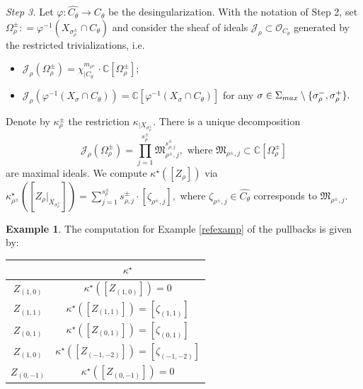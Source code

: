 \documentclass[11pt, reqno]{amsart}
\theoremstyle{plain}
\theoremstyle{definition}
\newtheorem{example}[theorem]{Example}
\theoremstyle{remark}
\begin{document}
\emph{Step 3.}
Let $\varphi: \widehat{C_{\theta}}\rightarrow C_{\theta}$ be the desingularization. With the notation of Step 2, set $\Omega^{\pm}_{\rho} : = 
\varphi^{-1}(X_{\sigma_{\rho}^{\pm}}\cap C_{\theta})$ and consider the sheaf of ideals $\mathscr{J}_{\rho}\subset \mathcal{O}_{C_{\theta}}$ generated by the restricted trivializations, i.e.
\begin{itemize}
\item[(i)] $\mathscr{J}_{\rho}(\Omega_{\rho}^{\pm}) =  \chi^{m_{\rho^{\pm}}}_{|C_{\theta}}\cdot \mathbb{C}[\Omega^{\pm}_{\rho}]$;
\item[(ii)] $\mathscr{J}_{\rho}(\varphi^{-1}(X_{\sigma}\cap C_{\theta})) =  \mathbb{C}[\varphi^{-1}(X_{\sigma}\cap C_{\theta})]$ for any 
$\sigma\in \Sigma_{\rm max}\setminus\{\sigma_{\rho}^{-}, \sigma_{\rho}^{+}\}.$
\end{itemize}
Denote by $\kappa_{\rho}^{\pm}$ the restriction $\kappa_{|X_{\sigma_{\rho}^{\pm}}}$. There is a unique decomposition 
$$\mathscr{J}_{\rho}(\Omega_{\rho}^{\pm}) =  \prod_{j = 1}^{s_{\rho}^{\pm}}\mathfrak{M}_{\rho^{\pm}, j}^{s_{\rho, j}^{\pm}},\text{ where }\mathfrak{M}_{\rho^{\pm}, j}\subset \mathbb{C}[\Omega_{\rho}^{\pm}]$$
are maximal ideals. 
We compute $\kappa^{\star}([Z_{\rho}])$ via 
$\kappa^{\star}_{\rho^{\pm}}([Z_{\rho}|_{X_{\sigma_{\rho}^{\pm}}}]) =  \sum_{j = 1}^{s_{\rho}^{\pm}}s_{\rho, j}^{\pm}\cdot [\zeta_{\rho^{\pm}, j}],$
where $\zeta_{\rho^{\pm}, j}\in \widehat{C_{\theta}}$ corresponds to $\mathfrak{M}_{\rho^{\pm}, j}$.
\begin{example}\label{refexamp03}
The computation for Example \ref{refexamp} of the pullbacks is given by:
\begin{center}
 \begin{tabular}{|c| c |} 
 \hline
  & $\kappa^{\star}$ \\ [1ex] 
 \hline\hline
 $Z_{(1, 0)}$ & $\kappa^{\star}([Z_{(1, 0)}]) =  0$ \\ [2ex] 
 \hline
 $Z_{(1, 1)}$ & $\kappa^{\star}([Z_{(1, 1)}]) =  [\zeta_{(1,1)}]$ \\  [2ex] 
 \hline
 $Z_{(0, 1)}$ & $\kappa^{\star}([Z_{(0, 1)}]) =  [\zeta_{(0,1)}]$ \\ [2ex] 
 \hline
 $Z_{(1, 0)}$ & $\kappa^{\star}([Z_{(-1, -2)}]) =  [\zeta_{(-1, -2)}]$ \\ [2ex] 
 \hline
 $Z_{(0, -1)}$ & $\kappa^{\star}([Z_{(0, -1)}]) =  0$ \\  [2ex] 
 \hline
\end{tabular}
\end{center}
\end{example}
\end{document}
